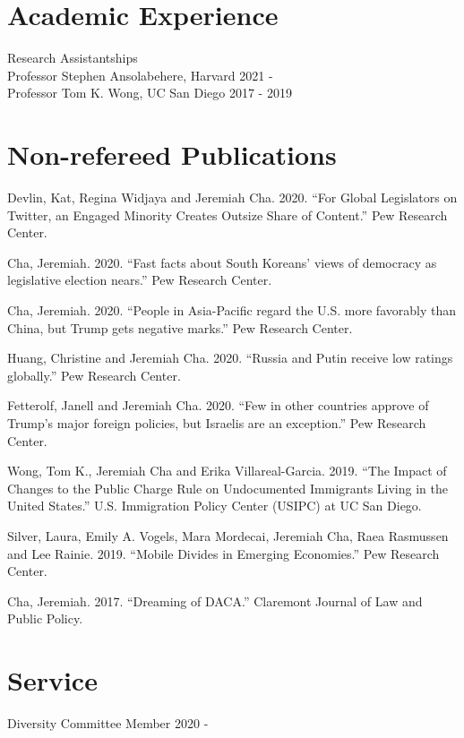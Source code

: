 \documentclass[margin, line]{res}
\begin{document}
\begin{resume}
\section{Academic Experience}
Research Assistantships \\
\hspace*{5mm} Professor Stephen Ansolabehere, Harvard \hfill 2021 - \\
\hspace*{5mm} Professor Tom K. Wong, UC San Diego \hfill 2017 - 2019

\section{Non-refereed Publications}

\begin{etaremune}
	\item Devlin, Kat, Regina Widjaya and Jeremiah Cha. 2020. ``For Global Legislators on Twitter, an Engaged Minority Creates Outsize Share of Content.'' Pew Research Center. 
	\item Cha, Jeremiah. 2020. ``Fast facts about South Koreans’ views of democracy as legislative election nears.'' Pew Research Center.
	\item Cha, Jeremiah. 2020. ``People in Asia-Pacific regard the U.S. more favorably than China, but Trump gets negative marks.'' Pew Research Center.
	\item Huang, Christine and Jeremiah Cha. 2020. ``Russia and Putin receive low ratings globally.'' Pew Research Center.
	\item Fetterolf, Janell and Jeremiah Cha. 2020. ``Few in other countries approve of Trump’s major foreign policies, but Israelis are an exception.'' Pew Research Center.
	\item Wong, Tom K., Jeremiah Cha and Erika Villareal-Garcia. 2019. ``The Impact of Changes to the Public Charge Rule on Undocumented Immigrants Living in the United States.'' U.S. Immigration Policy Center (USIPC) at UC San Diego.
	\item Silver, Laura, Emily A. Vogels, Mara Mordecai, Jeremiah Cha, Raea Rasmussen and Lee Rainie. 2019. ``Mobile Divides in Emerging Economies.'' Pew Research Center.
	\item Cha, Jeremiah. 2017. ``Dreaming of DACA.'' Claremont Journal of Law and Public Policy. 
\end{etaremune}



\section{Service}
Diversity Committee Member \hfill 2020 -


\end{resume}
\end{document}
